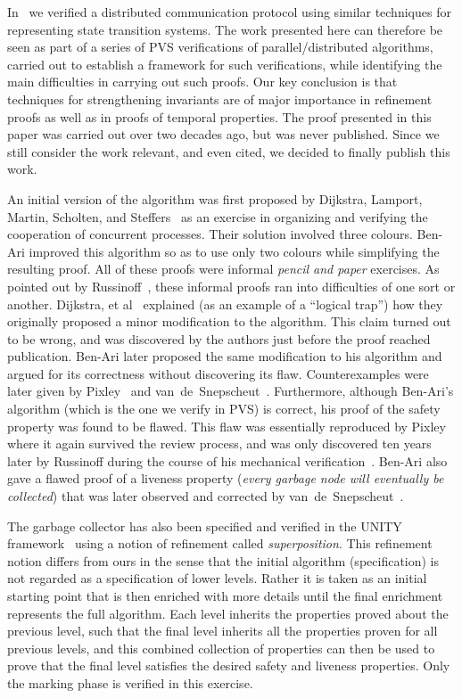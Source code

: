 In~\cite{HS:BRP}  we verified  a  distributed communication  protocol
using similar techniques for representing  state transition systems. 
The work  presented here can therefore be   seen as part of a
series of  PVS verifications of parallel/distributed algorithms, 
carried out to establish a framework for such verifications, while
identifying the main difficulties  in carrying  out such
proofs. Our  key conclusion  is  that  techniques for
strengthening invariants are  of major importance in refinement
proofs as well as in proofs of temporal properties.  
%
The proof presented in this paper was carried out over two decades ago, but
was never published. Since we still consider the work relevant, and even
cited, we decided to finally publish this work.

An initial  version of the algorithm  was  first proposed by Dijkstra,
Lamport, Martin, Scholten, and Steffers~\cite{DLMSS:GC} as an exercise
in  organizing and verifying the cooperation  of concurrent processes. 
Their solution   involved   three  colours.   Ben-Ari    improved this
algorithm so  as  to use    only  two colours  while  simplifying  the
resulting proof.  All of these  proofs were  informal {\em pencil  and
  paper\/} exercises.  As   pointed  out by   Russinoff~\cite{Rus:GC},
these informal proofs  ran into difficulties  of one sort or  another. 
Dijkstra, et al~\cite{DLMSS:GC}    explained   (as an  example  of   a
``logical trap'') how they originally proposed a minor modification to
the  algorithm.   This claim turned   out  to   be  wrong, and  was
discovered by the authors just  before the proof reached publication.  
Ben-Ari  later  proposed the same  modification   to his algorithm and
argued for   its    correctness   without  discovering its       flaw. 
Counterexamples    were  later  given    by  Pixley~\cite{Pix:GC}  and
van~de~Snepscheut~\cite{Van:GC}.   Furthermore,  although    Ben-Ari's
algorithm (which is the one we verify in PVS) is correct, his proof of
the safety property was found to be flawed.  This flaw was essentially
reproduced by Pixley\cite{Pix:GC} where it  again survived the  review
process, and was only discovered  ten years later by Russinoff  during
the course of his mechanical verification~\cite{Rus:GC}.  Ben-Ari also
gave a flawed  proof of a liveness  property ({\em every garbage  node
  will eventually be collected}) that was later observed and corrected
by van~de~Snepscheut~\cite{Van:GC}.

The garbage collector  has  also been  specified  and verified in  the
UNITY  framework~\cite{CM:UNITY} using a  notion of  refinement called
{\em superposition}.  This refinement notion differs  from ours in the
sense that the initial algorithm (specification)  is not regarded as a
specification of lower levels.   Rather   it is  taken as an   initial
starting point that is then enriched with more details until the final
enrichment   represents the full   algorithm.  Each level inherits the
properties proved about the previous  level, such that the final level
inherits  all the properties proven  for all previous levels, and this
combined collection of  properties can then be used  to prove that the
final level satisfies  the desired  safety  and liveness  properties.  
Only the marking phase is verified in this exercise.


